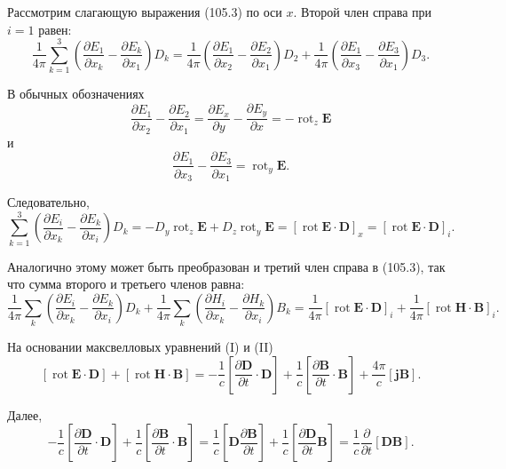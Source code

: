 \documentclass[a4paper,12pt]{article}
\begin{document}
Рассмотрим слагающую выражения (105.3) по оси $x$. Второй член справа
при $i = 1$ равен:
$$
    \frac{1}{4\pi}\sum_{k=1}^3\!\left(
        \frac{\partial E_1}{\partial x_k} - \frac{\partial E_k}{\partial x_1}
    \right)D_k
    = \frac{1}{4\pi}\!\left(
        \frac{\partial E_1}{\partial x_2} - \frac{\partial E_2}{\partial x_1}
    \right)D_2
    + \frac{1}{4\pi}\!\left(
        \frac{\partial E_1}{\partial x_3} - \frac{\partial E_3}{\partial x_1}
    \right)D_3.
$$


В обычных обозначениях
$$
    \frac{\partial E_1}{\partial x_2} - \frac{\partial E_2}{\partial x_1}
    = \frac{\partial E_x}{\partial y} - \frac{\partial E_y}{\partial x}
    = -\operatorname{rot}_z\mathbf{E}
$$
и
$$
    \frac{\partial E_1}{\partial x_3} - \frac{\partial E_3}{\partial x_1}
    = \operatorname{rot}_y\mathbf{E}.
$$

Следовательно,
$$
    \sum_{k=1}^3\!\left(
        \frac{\partial E_i}{\partial x_k} - \frac{\partial E_k}{\partial x_i}
    \right)D_k
    = -D_y\operatorname{rot}_z\mathbf{E} + D_z\operatorname{rot}_y\mathbf{E}
    = [\operatorname{rot}\mathbf{E}\cdot\mathbf{D}]_x
    = [\operatorname{rot}\mathbf{E}\cdot\mathbf{D}]_i.
$$

Аналогично этому может быть преобразован и третий член справа в (105.3),
так что сумма второго и третьего членов равна:
$$
    \frac{1}{4\pi}\sum_k\!\left(
        \frac{\partial E_i}{\partial x_k} - \frac{\partial E_k}{\partial x_i}
    \right)D_k
    + \frac{1}{4\pi}\sum_k\!\left(
        \frac{\partial H_i}{\partial x_k} - \frac{\partial H_k}{\partial x_i}
    \right)B_k
    = \frac{1}{4\pi}[\operatorname{rot}\mathbf{E}\cdot\mathbf{D}]_i
    + \frac{1}{4\pi}[\operatorname{rot}\mathbf{H}\cdot\mathbf{B}]_i.
$$

На основании максвелловых уравнений (I) и (II)
$$
    [\operatorname{rot}\mathbf{E}\cdot\mathbf{D}]
    + [\operatorname{rot}\mathbf{H}\cdot\mathbf{B}]
    = -\frac{1}{c}\!\left[\frac{\partial\mathbf{D}}{\partial t}\cdot\mathbf{D}\right]
    + \frac{1}{c}\!\left[\frac{\partial\mathbf{B}}{\partial t}\cdot\mathbf{B}\right]
    + \frac{4\pi}{c}[\mathbf{j}\mathbf{B}].
$$

Далее,
$$
    -\frac{1}{c}\!\left[\frac{\partial\mathbf{D}}{\partial t}\cdot\mathbf{D}\right]
    + \frac{1}{c}\!\left[\frac{\partial\mathbf{B}}{\partial t}\cdot\mathbf{B}\right]
    = \frac{1}{c}\!\left[\mathbf{D}\frac{\partial\mathbf{B}}{\partial t}\right]
    + \frac{1}{c}\!\left[\frac{\partial\mathbf{D}}{\partial t}\mathbf{B}\right]
    = \frac{1}{c}\frac{\partial}{\partial t}[\mathbf{D}\mathbf{B}].
$$
\end{document}
